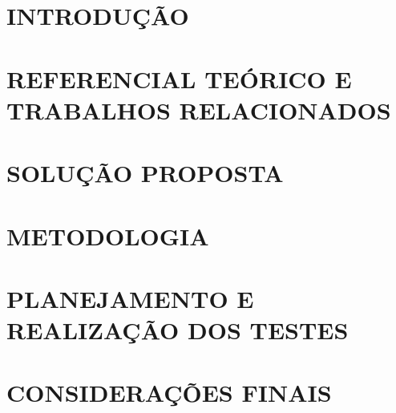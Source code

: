 \documentclass[
        oneside,      %
        english,			
        brazil			 
        ]{configcefetmglpd}
\begin{document}
 
\tableofcontents*
\cleardoublepage


\textual %


\chapter{INTRODUÇÃO}


\chapter{REFERENCIAL TEÓRICO E TRABALHOS RELACIONADOS} \label{cap:referencial}


\chapter{SOLUÇÃO PROPOSTA} \label{cap:proposta}


\chapter{METODOLOGIA} \label{cap:modelagem}



\chapter{PLANEJAMENTO E REALIZAÇÃO DOS TESTES} \label{cap:testes}



\chapter{CONSIDERAÇÕES FINAIS} \label{cap:consideracoes}



\postextual



\appendix

\end{document}
